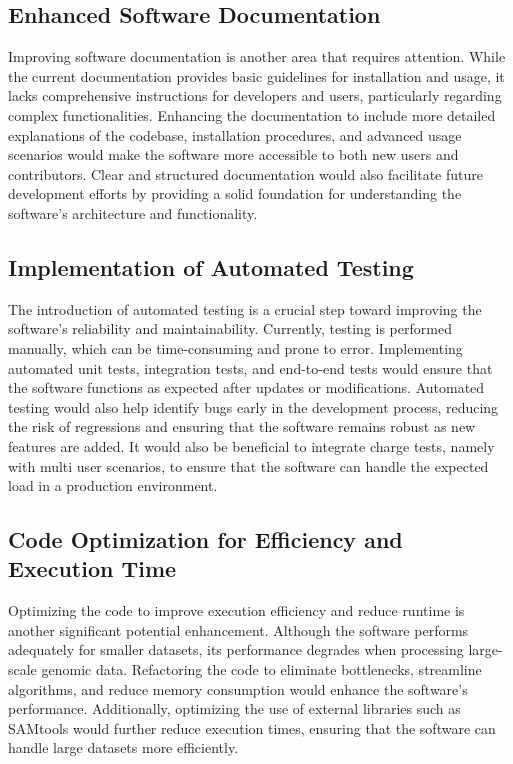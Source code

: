 \subsection{Enhanced Software Documentation}
Improving software documentation is another area that requires attention. While the current documentation provides basic guidelines for installation and usage, it lacks comprehensive instructions for developers and users, particularly regarding complex functionalities. Enhancing the documentation to include more detailed explanations of the codebase, installation procedures, and advanced usage scenarios would make the software more accessible to both new users and contributors. Clear and structured documentation would also facilitate future development efforts by providing a solid foundation for understanding the software's architecture and functionality.

\subsection{Implementation of Automated Testing}
The introduction of automated testing is a crucial step toward improving the software's reliability and maintainability. Currently, testing is performed manually, which can be time-consuming and prone to error. Implementing automated unit tests, integration tests, and end-to-end tests would ensure that the software functions as expected after updates or modifications. Automated testing would also help identify bugs early in the development process, reducing the risk of regressions and ensuring that the software remains robust as new features are added. It would also be beneficial to integrate charge tests, namely with multi user scenarios, to ensure that the software can handle the expected load in a production environment.

\subsection{Code Optimization for Efficiency and Execution Time}
Optimizing the code to improve execution efficiency and reduce runtime is another significant potential enhancement. Although the software performs adequately for smaller datasets, its performance degrades when processing large-scale genomic data. Refactoring the code to eliminate bottlenecks, streamline algorithms, and reduce memory consumption would enhance the software's performance. Additionally, optimizing the use of external libraries such as SAMtools would further reduce execution times, ensuring that the software can handle large datasets more efficiently.

